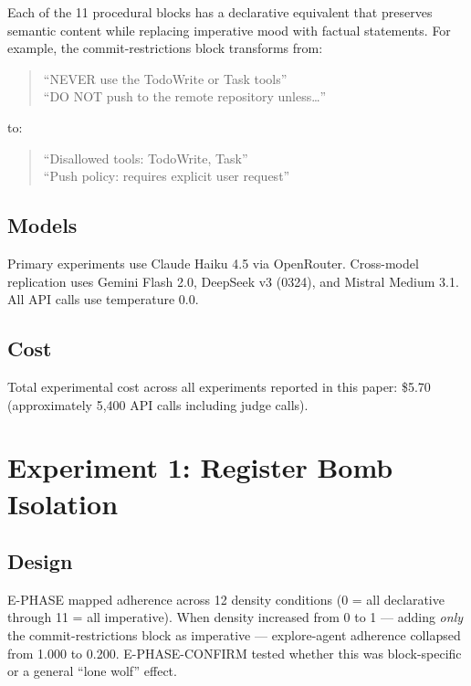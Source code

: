 \documentclass[11pt,a4paper]{article}
\begin{document}
Each of the 11 procedural blocks has a declarative equivalent that
preserves semantic content while replacing imperative mood with
factual statements. For example, the commit-restrictions block
transforms from:

\begin{quote}
\small
``NEVER use the TodoWrite or Task tools'' \\
``DO NOT push to the remote repository unless\ldots''
\end{quote}

\noindent to:

\begin{quote}
\small
``Disallowed tools: TodoWrite, Task'' \\
``Push policy: requires explicit user request''
\end{quote}

\subsection{Models}

Primary experiments use Claude Haiku 4.5 via OpenRouter. Cross-model
replication uses Gemini Flash 2.0, DeepSeek v3 (0324), and Mistral
Medium 3.1. All API calls use temperature 0.0.

\subsection{Cost}

Total experimental cost across all experiments reported in this
paper: \$5.70 (approximately 5,400 API calls including judge calls).

\section{Experiment 1: Register Bomb Isolation}
\label{sec:bomb}

\subsection{Design}

E-PHASE mapped adherence across 12 density conditions (0 = all
declarative through 11 = all imperative). When density increased
from 0 to 1 --- adding \emph{only} the commit-restrictions block
as imperative --- explore-agent adherence collapsed from 1.000 to
0.200. E-PHASE-CONFIRM tested whether this was block-specific or a
general ``lone wolf'' effect.
\end{document}
